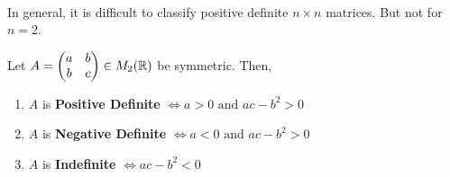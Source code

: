 \documentclass[../Analysis-3.tex]{subfiles}
\begin{document}
\

In general, it is difficult to classify positive definite $n \times n$ matrices. But not for $n = 2$.

\begin{Thm}{}{}
  Let $A = \begin{pmatrix}
      a & b \\
      b & c
    \end{pmatrix} \in M_2(\mathbb{R}) $ be symmetric. Then,
  \begin{enumerate}[label=(\roman*)]
    \item $A$ is \textbf{Positive Definite} $ \Longleftrightarrow a > 0 \text{ and } ac -b^2 >0 $ \label{charpd}
    \item $A$ is \textbf{Negative Definite} $ \Longleftrightarrow a < 0 \text{ and } ac -b^2 >0 $ \label{charnd}
    \item $A$ is \textbf{Indefinite} $ \Longleftrightarrow ac -b^2 <0 $ \label{charind}
  \end{enumerate}
\end{Thm}
\end{document}
